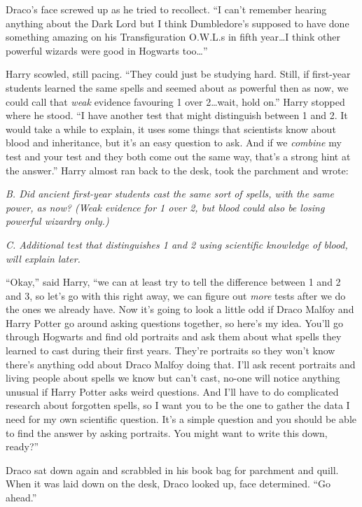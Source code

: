 Draco’s face screwed up as he tried to recollect. “I can’t remember hearing anything about the Dark Lord but I think Dumbledore’s supposed to have done something amazing on his Transfiguration O.W.L.s in fifth year…I think other powerful wizards were good in Hogwarts too…”

Harry scowled, still pacing. “They could just be studying hard. Still, if first-year students learned the same spells and seemed about as powerful then as now, we could call that \emph{weak} evidence favouring 1 over 2…wait, hold on.” Harry stopped where he stood. “I have another test that might distinguish between 1 and 2. It would take a while to explain, it uses some things that scientists know about blood and inheritance, but it’s an easy question to ask. And if we \emph{combine} my test and your test and they both come out the same way, that’s a strong hint at the answer.” Harry almost ran back to the desk, took the parchment and wrote:

\emph{B. Did ancient first-year students cast the same sort of spells, with the same power, as now? (Weak evidence for 1 over 2, but blood could also be losing powerful wizardry only.)}

\emph{C. Additional test that distinguishes 1 and 2 using scientific knowledge of blood, will explain later.}

“Okay,” said Harry, “we can at least try to tell the difference between 1 and 2 and 3, so let’s go with this right away, we can figure out \emph{more} tests after we do the ones we already have. Now it’s going to look a little odd if Draco Malfoy and Harry Potter go around asking questions together, so here’s my idea. You’ll go through Hogwarts and find old portraits and ask them about what spells they learned to cast during their first years. They’re portraits so they won’t know there’s anything odd about Draco Malfoy doing that. I’ll ask recent portraits and living people about spells we know but can’t cast, no-one will notice anything unusual if Harry Potter asks weird questions. And I’ll have to do complicated research about forgotten spells, so I want you to be the one to gather the data I need for my own scientific question. It’s a simple question and you should be able to find the answer by asking portraits. You might want to write this down, ready?”

Draco sat down again and scrabbled in his book bag for parchment and quill. When it was laid down on the desk, Draco looked up, face determined. “Go ahead.”

